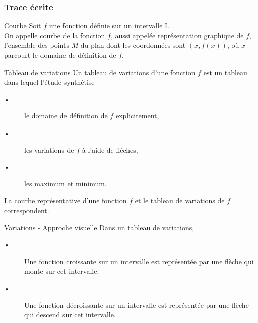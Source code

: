 \subsubsection{Trace écrite}

\begin{DefT}{Courbe}
Soit $f$ une fonction définie sur un intervalle I. \\
On appelle courbe de la fonction $f$, aussi appelée représentation graphique de $f$, l'ensemble des points $M$ du plan dont les coordonnées sont $(x,f(x))$, où $x$ parcourt le domaine de définition de $f$.
\end{DefT}

\begin{DefT}{Tableau de variations}
Un tableau de variations d'une fonction $f$ est un tableau dans lequel l'étude synthétise
\begin{description}
\item[•] le domaine de définition de $f$ explicitement,
\item[•] les variations de $f$ à l'aide de flèches,
\item[•] les maximum et minimum.
\end{description} 

\end{DefT}


\begin{Rq}
La courbe représentative d'une fonction $f$ et le tableau de variations de $f$ correspondent.
\end{Rq}


\begin{DefT}{Variations - Approche visuelle}
Dans un tableau de variations,
\begin{description}
\item[•] Une fonction croissante sur un intervalle est représentée par une flèche qui monte sur cet intervalle.
\item[•] Une fonction décroissante sur un intervalle est représentée par une flèche qui descend sur cet intervalle.
\end{description}
\end{DefT}


\begin{seanceprof}

\end{seanceprof}

